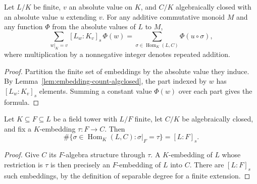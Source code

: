 \begin{lemma}
\label{lem:weighted-separable-embedding-sums}
\leanok
{}
Let $L/K$ be finite, $v$ an absolute value on $K$, and $C/K$
algebraically closed with an absolute value $u$ extending $v$.
For any additive commutative monoid $M$ and any function $\Phi$
from the absolute values of $L$ to $M$,
\[
 \sum_{w|_K=v}[L_w:K_v]_s\,\Phi(w)
 =
 \sum_{\sigma\in\operatorname{Hom}_K(L,C)}\Phi(u\circ\sigma),
\]
where multiplication by a nonnegative integer denotes repeated addition.
\end{lemma}
\begin{proof}
Partition the finite set of embeddings by the absolute value they induce.
By Lemma~\ref{lem:embedding-count-algclosed}, the part indexed by $w$
has $[L_w:K_v]_s$ elements. Summing a constant value $\Phi(w)$ over
each part gives the formula.
\end{proof}


\begin{lemma}
\label{lem:embedding-extension-count-general}
\leanok
{}
Let $K\subseteq F\subseteq L$ be a field tower with $L/F$ finite,
let $C/K$ be algebraically closed, and fix a $K$-embedding $\tau:F\to C$.
Then
\[
 \#\{\sigma\in\operatorname{Hom}_K(L,C):\sigma|_F=\tau\}=[L:F]_s.
\]
\end{lemma}
\begin{proof}
Give $C$ its $F$-algebra structure through $\tau$. A $K$-embedding
of $L$ whose restriction is $\tau$ is then precisely an $F$-embedding
of $L$ into $C$. There are $[L:F]_s$ such embeddings, by the
definition of separable degree for a finite extension.
\end{proof}

